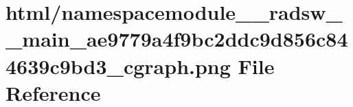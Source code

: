 \hypertarget{namespacemodule____radsw____main__ae9779a4f9bc2ddc9d856c844639c9bd3__cgraph_8png}{}\section{html/namespacemodule\+\_\+\+\_\+radsw\+\_\+\+\_\+main\+\_\+ae9779a4f9bc2ddc9d856c844639c9bd3\+\_\+cgraph.png File Reference}
\label{namespacemodule____radsw____main__ae9779a4f9bc2ddc9d856c844639c9bd3__cgraph_8png}
